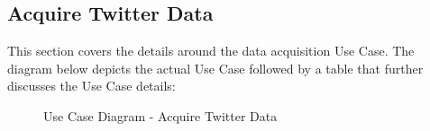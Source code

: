 \documentclass[12pt]{article} %
\begin{document}
   \subsection{Acquire Twitter Data}
	
	This section covers the details around the data acquisition Use Case. The diagram below depicts the actual Use Case followed by a table that further discusses the Use Case details:
	
		\begin{figure}[H] %
			\caption{Use Case Diagram - Acquire Twitter Data}
			\label{fig:speciation}
		\end{figure}
		
\end{document}
